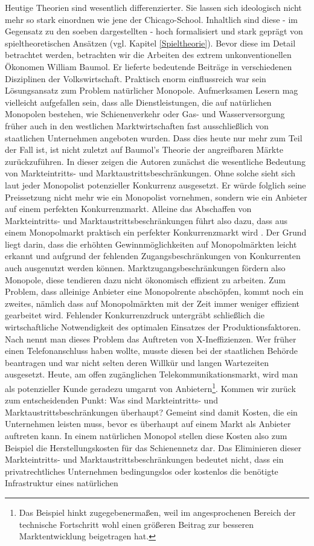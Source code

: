 Heutige Theorien sind wesentlich differenzierter. Sie lassen sich ideologisch nicht mehr so stark einordnen wie jene der Chicago-School. Inhaltlich sind diese - im Gegensatz zu den soeben dargestellten - hoch formalisiert und stark geprägt von spieltheoretischen Ansätzen (vgl. Kapitel \ref{Spieltheorie}). Bevor diese im Detail betrachtet werden, betrachten wir die Arbeiten des extrem unkonventionellen Ökonomen William Baumol. Er lieferte bedeutende Beiträge in verschiedenen Disziplinen der Volkswirtschaft. Praktisch enorm einflussreich war sein Lösungsansatz zum Problem natürlicher Monopole. Aufmerksamen Lesern mag vielleicht aufgefallen sein, dass alle Dienstleistungen, die auf natürlichen Monopolen bestehen, wie Schienenverkehr oder Gas- und Wasserversorgung früher auch in den westlichen Marktwirtschaften fast ausschließlich von staatlichen Unternehmen angeboten wurden. Dass dies heute nur mehr zum Teil der Fall ist, ist nicht zuletzt auf Baumol's Theorie der angreifbaren Märkte \parencite{Baumol1982, Baumol1982b} zurückzuführen. In dieser zeigen die Autoren zunächst die wesentliche Bedeutung von Markteintritts- und Marktaustrittsbeschränkungen. Ohne solche sieht sich laut \textcite{Baumol1982} jeder Monopolist potenzieller Konkurrenz ausgesetzt. Er würde folglich seine Preissetzung nicht mehr wie ein Monopolist vornehmen, sondern wie ein Anbieter auf einem perfekten Konkurrenzmarkt. Alleine das Abschaffen von Markteintritts- und Marktaustrittsbeschränkungen führt also dazu, dass aus einem Monopolmarkt praktisch ein perfekter Konkurrenzmarkt wird \parencite[S. 2]{Baumol1982b}. Der Grund liegt darin, dass die erhöhten Gewinnmöglichkeiten auf Monopolmärkten leicht erkannt und aufgrund der fehlenden Zugangsbeschränkungen von Konkurrenten auch ausgenutzt werden können. Marktzugangsbeschränkungen fördern also Monopole, diese tendieren dazu nicht ökonomisch effizient zu arbeiten. Zum Problem, dass alleinige Anbieter eine Monopolrente abschöpfen, kommt noch ein zweites, nämlich dass auf Monopolmärkten mit der Zeit immer weniger effizient gearbeitet wird. Fehlender Konkurrenzdruck untergräbt schließlich die wirtschaftliche Notwendigkeit des optimalen Einsatzes der Produktionsfaktoren. Nach \textcite{Leibenstein1966} nennt man dieses Problem das Auftreten von X-Ineffizienzen. Wer früher einen Telefonanschluss haben wollte, musste diesen bei der staatlichen Behörde beantragen und war nicht selten deren Willkür und langen Wartezeiten ausgesetzt. Heute, am offen zugänglichen Telekommunikationsmarkt, wird man als potenzieller Kunde geradezu umgarnt von Anbietern\footnote{Das Beispiel hinkt zugegebenermaßen, weil im angesprochenen Bereich der technische Fortschritt wohl einen größeren Beitrag zur besseren Marktentwicklung beigetragen hat.}. Kommen wir zurück zum entscheidenden Punkt: Was sind Markteintritts- und Marktaustrittsbeschränkungen überhaupt? Gemeint sind damit Kosten, die ein Unternehmen leisten muss, bevor es überhaupt auf einem Markt als Anbieter auftreten kann. In einem natürlichen Monopol stellen diese Kosten also zum Beispiel die Herstellungskosten für das Schienennetz dar. Das Eliminieren dieser Markteintritts- und Marktaustrittsbeschränkungen bedeutet nicht, dass ein privatrechtliches Unternehmen bedingungslos oder kostenlos die benötigte Infrastruktur eines natürlichen 